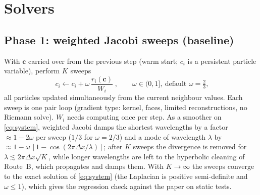 \documentclass[11pt,a4paper]{article}
\begin{document}
\section{Solvers}
\subsection{Phase 1: weighted Jacobi sweeps (baseline)}
With $\bm c$ carried over from the previous step (warm start; $c_i$ is a persistent particle variable), perform $K$ sweeps
\begin{equation}
\boxed{\;c_i\leftarrow c_i+\omega\,\frac{r_i(\bm c)}{W_i}\;},\qquad \omega\in(0,1],\ \text{default }\omega=\tfrac23,
\label{eq:jacobi}
\end{equation}
all particles updated simultaneously from the current neighbour values. Each sweep is one pair loop (gradient type: kernel, faces, limited reconstructions, no Riemann solve). $W_i$ needs computing once per step. As a smoother on \eqref{eq:system}, weighted Jacobi damps the shortest wavelengths by a factor $\approx1-2\omega$ per sweep ($1/3$ for $\omega=2/3$) and a mode of wavelength $\lambda$ by $\approx1-\omega\,[1-\cos(2\pi\Delta x/\lambda)]$; after $K$ sweeps the divergence is removed for $\lambda\lesssim2\pi\Delta x\sqrt{K}$, while longer wavelengths are left to the hyperbolic cleaning of Route~B, which propagates and damps them. With $K\to\infty$ the sweeps converge to the exact solution of \eqref{eq:system} (the Laplacian is positive semi-definite and $\omega\le1$), which gives the regression check against the paper on static tests.
\end{document}
